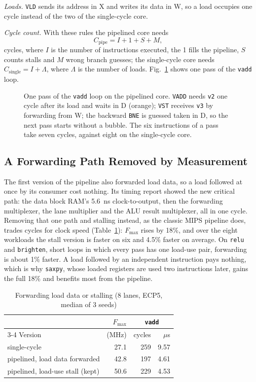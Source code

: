 \emph{Loads.} \texttt{VLD} sends its address in X and writes its data in W, so a load
occupies one cycle instead of the two of the single-cycle core.

\emph{Cycle count.} With these rules the pipelined core needs
\begin{equation}
C_{\mathrm{pipe}} = I + 1 + S + M,
\end{equation}
cycles, where $I$ is the number of instructions executed, the 1 fills the pipeline, $S$
counts stalls and $M$ wrong branch guesses; the single-cycle core needs
$C_{\mathrm{single}} = I + \Lambda$, where $\Lambda$ is the number of loads.
Fig.~\ref{fig:timing} shows one pass of the \texttt{vadd} loop.

\begin{figure}[t]
\centering

\caption{One pass of the \texttt{vadd} loop on the pipelined core. \texttt{VADD} needs
\texttt{v2} one cycle after its load and waits in D (orange); \texttt{VST} receives
\texttt{v3} by forwarding from W; the backward \texttt{BNE} is guessed taken in D, so the
next pass starts without a bubble. The six instructions of a pass take seven cycles,
against eight on the single-cycle core.}
\label{fig:timing}
\end{figure}

\subsection{A Forwarding Path Removed by Measurement}\label{sec:fwdload}
The first version of the pipeline also forwarded load data, so a load followed at once
by its consumer cost nothing. Its timing report showed the new critical path: the data
block RAM's 5.6~ns clock-to-output, then the forwarding multiplexer, the lane multiplier
and the ALU result multiplexer, all in one cycle. Removing that one path and stalling
instead, as the classic MIPS pipeline does, trades cycles for clock speed
(Table~\ref{tab:fwd}): $F_{\max}$ rises by 18\%, and over the eight workloads the
stall version is faster on six and 4.5\% faster on average. On \texttt{relu} and
\texttt{brighten}, short loops in which every pass has one load-use pair, forwarding is
about 1\% faster. A load followed by an independent instruction pays nothing, which is
why \texttt{saxpy}, whose loaded registers are used two instructions later, gains the
full 18\% and benefits most from the pipeline.

\begin{table}[t]
\centering
\caption{Forwarding load data or stalling (8 lanes, ECP5, median of 3 seeds)}
\label{tab:fwd}
\footnotesize
\begin{tabular}{@{}lrrr@{}}
\toprule
 & $F_{\max}$ & \multicolumn{2}{c}{\texttt{vadd}} \\
\cmidrule(l){3-4}
Version & (MHz) & cycles & $\mu$s \\
\midrule
single-cycle & 27.1 & 259 & 9.57 \\
pipelined, load data forwarded & 42.8 & 197 & 4.61 \\
pipelined, load-use stall (kept) & 50.6 & 229 & 4.53 \\
\bottomrule
\end{tabular}
\end{table}

